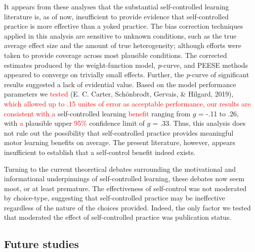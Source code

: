 \documentclass[
  english,
  man,floatsintext]{apa7}
\begin{document}
It appears from these analyses that the substantial self-controlled learning literature is, as of now, insufficient to provide evidence that self-controlled practice is more effective than a yoked practice. The bias correction techniques applied in this analysis are sensitive to unknown conditions, such as the true average effect size and the amount of true heterogeneity; although efforts were taken to provide coverage across most plausible conditions. The corrected estimates produced by the weight-function model, \emph{p}-curve, and PEESE methods appeared to converge on trivially small effects. Further, the \emph{p}-curve of significant results suggested a lack of evidential value. Based on the model performance parameters we \textcolor{red}{tested} (E. C. Carter, Schönbrodt, Gervais, \& Hilgard, 2019), \textcolor{red}{which allowed up to .15 unites of error as acceptable performance, our results are consistent with a} self-controlled learning \textcolor{red}{benefit} ranging from \(g\) = -.11 to .26, with \textcolor{red}{a} plausible upper \textcolor{red}{95\%} confidence limit of \(g\) = .33. Thus, this analysis does not rule out the possibility that self-controlled practice provides meaningful motor learning benefits on average. The present literature, however, appears insufficient to establish that a self-control benefit indeed exists.

Turning to the current theoretical debates surrounding the motivational and informational underpinnings of self-controlled learning, these debates now seem moot, or at least premature. The effectiveness of self-control was not moderated by choice-type, suggesting that self-controlled practice may be ineffective regardless of the nature of the choices provided. Indeed, the only factor we tested that moderated the effect of self-controlled practice was publication status.

\hypertarget{future-studies}{%
\subsection{Future studies}\label{future-studies}}
\end{document}
